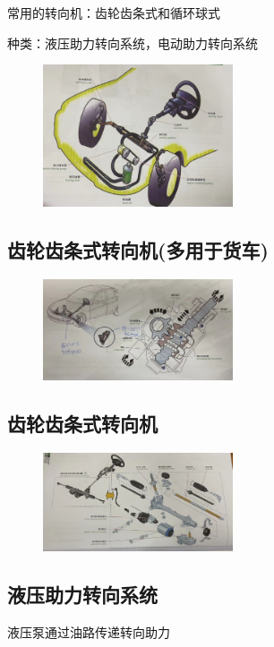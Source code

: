 	常用的转向机：齿轮齿条式和循环球式
	
	种类：液压助力转向系统，电动助力转向系统
	
		\begin{figure}[htbp]
			\centering
			\includegraphics[width=0.5\textwidth]{3-33}
		\end{figure}
\subsection{齿轮齿条式转向机(多用于货车)}
	\begin{figure}[htbp]
		\centering
		\includegraphics[width=0.5\textwidth]{3-34}
	\end{figure}
\subsection{齿轮齿条式转向机}
	\begin{figure}[htbp]
		\centering
		\includegraphics[width=0.5\textwidth]{3-35}
	\end{figure}
\subsection{液压助力转向系统}
	液压泵通过油路传递转向助力
	
